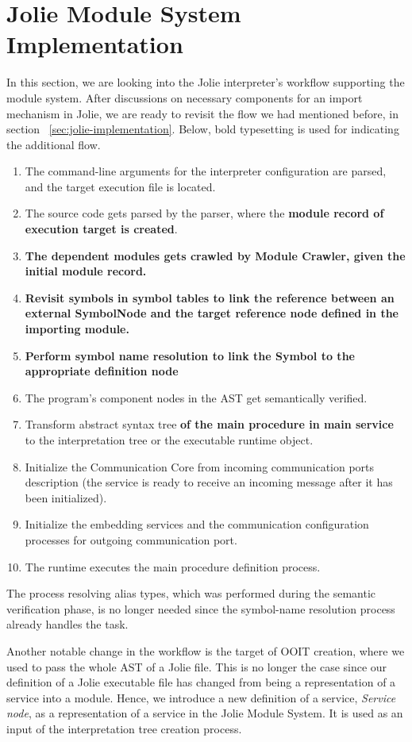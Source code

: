 
\section{Jolie Module System Implementation}

In this section, we are looking into the Jolie interpreter's workflow supporting the module system. After discussions on necessary components for an import mechanism in Jolie, we are ready to revisit the flow we had mentioned before, in section ~\ref{sec:jolie-implementation}. Below, bold typesetting is used for indicating the additional flow.

\begin{enumerate}
    \item The command-line arguments for the interpreter configuration are parsed, and the target execution file is located.
    \item The source code gets parsed by the parser, where the \textbf{module record of execution target is created}.
    \item \textbf{The dependent modules gets crawled by Module Crawler, given the initial module record.}
    \item \textbf{Revisit symbols in symbol tables to link the reference between an external SymbolNode and the target reference node defined in the importing module.}
    \item \textbf{Perform symbol name resolution to link the Symbol to the appropriate definition node}
    \item The program's component nodes in the AST get semantically verified.
    \item Transform abstract syntax tree \textbf{of the main procedure in main service} to the interpretation tree or the executable runtime object.
    \item Initialize the Communication Core from incoming communication ports description (the service is ready to receive an incoming message after it has been initialized).
    \item Initialize the embedding services and the communication configuration processes for outgoing communication port.
    \item The runtime executes the main procedure definition process.
\end{enumerate}

The process resolving alias types, which was performed during the semantic verification phase, is no longer needed since the symbol-name resolution process already handles the task.

Another notable change in the workflow is the target of OOIT creation, where we used to pass the whole AST of a Jolie file. This is no longer the case since our definition of a Jolie executable file has changed from being a representation of a service into a module.
Hence, we introduce a new definition of a service, \textit{Service node}, as a representation of a service in the Jolie Module System. It is used as an input of the interpretation tree creation process.